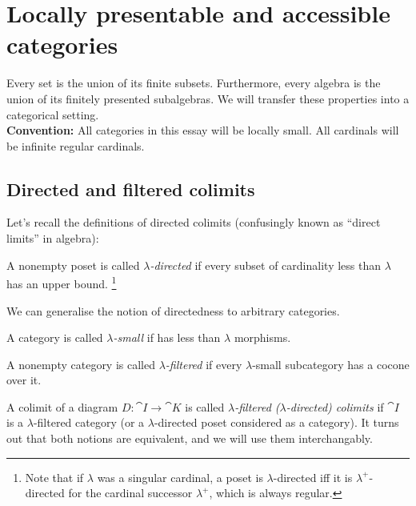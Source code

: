 \section{Locally presentable and accessible categories}
\label{sec:presentableaccessible}


Every set is the union of its finite subsets. Furthermore, every algebra is the union of its finitely presented subalgebras. We will transfer these properties into a categorical setting. \\

\textbf{Convention: } All categories in this essay will be locally small. All cardinals will be infinite regular cardinals.

\subsection{Directed and filtered colimits}

Let's recall the definitions of directed colimits (confusingly known as ``direct limits'' in algebra):
\begin{Definition}
A nonempty poset is called \emph{$\lambda$-directed} if every subset of cardinality less than $\lambda$ has an upper bound. \footnote{Note that if $\lambda$ was a singular cardinal, a poset is $\lambda$-directed iff it is $\lambda^+$-directed for the cardinal successor $\lambda^+$, which is always regular.}
\end{Definition}

We can generalise the notion of directedness to arbitrary categories.

\begin{Definition}
A category is called \emph{$\lambda$-small} if has less than $\lambda$ morphisms.
\end{Definition}

\begin{Definition}
A nonempty category is called \emph{$\lambda$-filtered} if every $\lambda$-small subcategory has a cocone over it. 
\end{Definition}

A colimit of a diagram $D : \cat I \to \cat K$ is called \emph{$\lambda$-filtered ($\lambda$-directed) colimits} if $\cat I$ is a $\lambda$-filtered category (or a $\lambda$-directed poset considered as a category). It turns out that both notions are equivalent, and we will use them interchangably.

